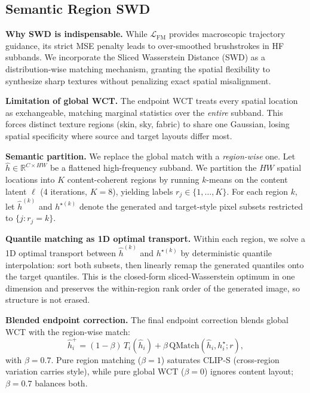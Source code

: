 \documentclass[letterpaper]{article}
\begin{document}
\subsection{Semantic Region SWD}
\label{sec:semswd}

\textbf{Why SWD is indispensable.}
While $\mathcal L_{\mathrm{FM}}$ provides macroscopic trajectory guidance, its strict MSE penalty leads to over-smoothed brushstrokes in HF subbands.
We incorporate the Sliced Wasserstein Distance (SWD) as a distribution-wise matching mechanism, granting the spatial flexibility to synthesize sharp textures without penalizing exact spatial misalignment.

\textbf{Limitation of global WCT.}
The endpoint WCT treats every spatial location as exchangeable, matching marginal statistics over the \emph{entire} subband.
This forces distinct texture regions (skin, sky, fabric) to share one Gaussian, losing spatial specificity where source and target layouts differ most.

\textbf{Semantic partition.}
We replace the global match with a \emph{region-wise} one.
Let $\hat h \in \mathbb R^{C\times HW}$ be a flattened high-frequency subband.
We partition the $HW$ spatial locations into $K$ content-coherent regions by running $k$-means on the content latent $\ell$ (4 iterations, $K{=}8$), yielding labels $r_j\in\{1,\ldots,K\}$.
For each region $k$, let $\hat h^{(k)}$ and $h^{\star(k)}$ denote the generated and target-style pixel subsets restricted to $\{j:r_j=k\}$.

\textbf{Quantile matching as 1D optimal transport.}
Within each region, we solve a 1D optimal transport between $\hat h^{(k)}$ and $h^{\star(k)}$ by deterministic quantile interpolation: sort both subsets, then linearly remap the generated quantiles onto the target quantiles.
This is the closed-form sliced-Wasserstein optimum in one dimension and preserves the within-region rank order of the generated image, so structure is not erased.

\textbf{Blended endpoint correction.}
The final endpoint correction blends global WCT with the region-wise match:
\begin{equation}
\hat h_i^{+} = (1-\beta)\,T_i(\hat h_i) + \beta\,\mathrm{QMatch}(\hat h_i, h_i^\star; r),
\label{eq:semswd}
\end{equation}
with $\beta=0.7$.
Pure region matching ($\beta{=}1$) saturates CLIP-S (cross-region variation carries style), while pure global WCT ($\beta{=}0$) ignores content layout; $\beta{=}0.7$ balances both.
\end{document}
